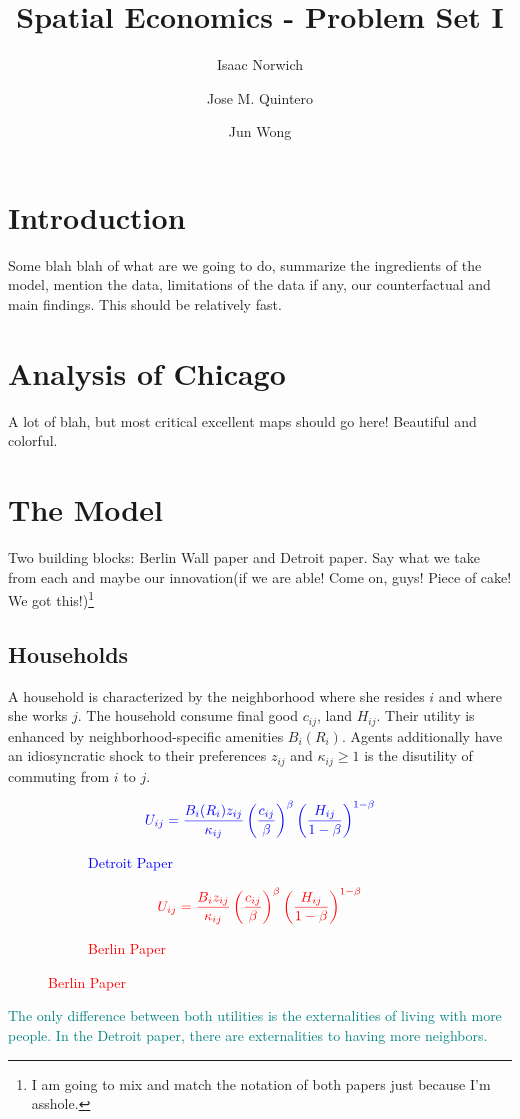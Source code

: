 \documentclass[12pt]{article}
\title{Spatial Economics - Problem Set I}
\author{Isaac Norwich \and Jose M. Quintero \and Jun Wong}
\begin{document}
\maketitle

\section{Introduction}

Some blah blah of what are we going to do, summarize the ingredients of the model, mention the data, limitations of the data if any, our counterfactual and main findings. This should be relatively fast. 

\section{Analysis of Chicago}

A lot of blah, but most critical excellent maps should go here! Beautiful and colorful. 

\section{The Model}
Two building blocks: Berlin Wall paper and Detroit paper. Say what we take from each and maybe our innovation(if we are able! Come on, guys! Piece of cake! We got this!)\footnote{I am going to mix and match the notation of both papers just because I'm asshole.}

\subsection{Households}
A household is characterized by the neighborhood where she resides $i$ and where she works $j$. The household consume final good $c_{ij}$, land $H_{ij}$. Their utility is enhanced by neighborhood-specific amenities $B_i(R_i)$. Agents additionally have an idiosyncratic shock to their preferences $z_{ij}$ and $\kappa_{ij}\geq 1$ is the disutility of commuting from $i$ to $j$.  \\ 
\begin{figure}[htb]
     \begin{center}
     \begin{subfigure}[b]{0.4\textwidth}
     \centering
         \[ \textcolor{blue}{U_{ij} = \frac{B_i(R_i)z_{ij}}{\kappa_{ij}}\left(\frac{c_{ij}}{\beta}\right)^{\beta}\left(\frac{H_{ij}}{1-\beta}\right)^{1-\beta}  } \]
         \caption{\textcolor{blue}{Detroit Paper}}
     \end{subfigure}
     \hfill
     \begin{subfigure}[b]{0.4\textwidth}
     \centering
          \[ \textcolor{red}{U_{ij} = \frac{B_iz_{ij}}{\kappa_{ij}}\left(\frac{c_{ij}}{\beta}\right)^{\beta}\left(\frac{H_{ij}}{1-\beta}\right)^{1-\beta}  } \]
         \caption{\textcolor{red}{Berlin Paper}}
     \end{subfigure}
     \end{center}
\end{figure}
\textcolor{teal}{The only difference between both utilities is the externalities of living with more people. In the Detroit paper, there are externalities to having more neighbors.} 
\end{document}
